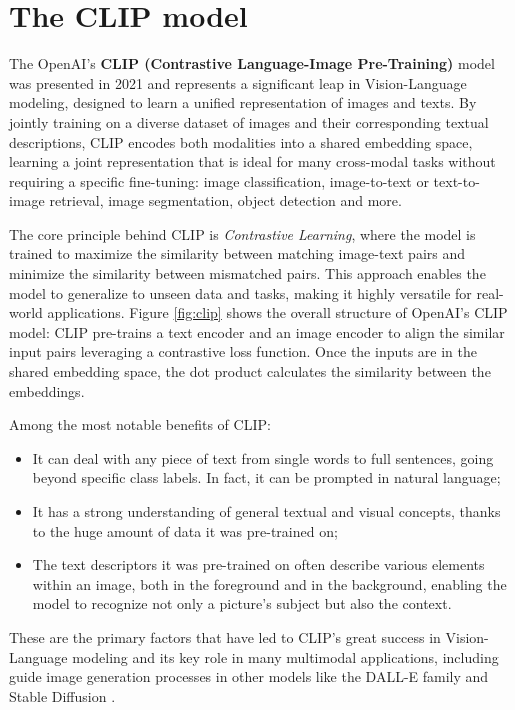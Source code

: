 \documentclass[a4paper, oneside, english]{sapthesis}
\begin{document}
\chapter{The CLIP model} %

The OpenAI's \textbf{CLIP (Contrastive Language-Image Pre-Training)} model \cite{radford2021learning} was presented in 2021 and represents a significant leap in Vision-Language modeling, designed to learn a unified representation of images and texts. By jointly training on a diverse dataset of images and their corresponding textual descriptions, CLIP encodes both modalities into a shared embedding space, learning a joint representation that is ideal for many cross-modal tasks without requiring a specific fine-tuning: image classification, image-to-text or text-to-image retrieval, image segmentation, object detection and more.

The core principle behind CLIP is \emph{Contrastive Learning}, where the model is trained to maximize the similarity between matching image-text pairs and minimize the similarity between mismatched pairs. This approach enables the model to generalize to unseen data and tasks, making it highly versatile for real-world applications. Figure \ref{fig:clip} shows the overall structure of OpenAI's CLIP model: CLIP pre-trains a text encoder and an image encoder to align the similar input pairs leveraging a contrastive loss function. Once the inputs are in the shared embedding space, the dot product calculates the similarity between the embeddings.

Among the most notable benefits of CLIP:

\begin{itemize}
    \item It can deal with any piece of text from single words to full sentences, going beyond specific class labels. In fact, it can be prompted in natural language;
    \item It has a strong understanding of general textual and visual concepts, thanks to the huge amount of data it was pre-trained on;
    \item The text descriptors it was pre-trained on often describe various elements within an image, both in the foreground and in the background, enabling the model to recognize not only a picture's subject but also the context.
\end{itemize}

These are the primary factors that have led to CLIP's great success in Vision-Language modeling and its key role in many multimodal applications, including guide image generation processes in other models like the DALL-E family \cite{ramesh2022hierarchical} and Stable Diffusion \cite{rombach2022high}.
\end{document}
